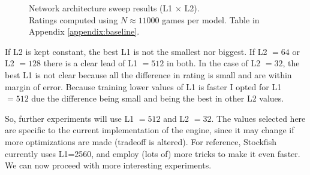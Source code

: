 \begin{figure}[h]
\centering
{}
\captionsetup{justification=centering}
\caption{Network architecture sweep results (L1 $\times$ L2).\\ Ratings computed using $N\approx11000$ games per model. Table in Appendix \ref{appendix:baseline}.}
\label{fig:baseline_heatmaps}
\end{figure}

If L2 is kept constant, the best L1 is not the smallest nor biggest. If L2 $=64$ or L2 $=128$ there is a clear lead of L1 $=512$ in both. In the case of L2 $=32$, the best L1 is not clear because all the difference in rating is small and are within margin of error. Because training lower values of L1 is faster I opted for L1 $=512$ due the difference being small and being the best in other L2 values.

So, further experiments will use L1 $=512$ and L2 $=32$. The values selected here are specific to the current implementation of the engine, since it may change if more optimizations are made (tradeoff is altered). For reference, Stockfish currently uses L1=2560, and employ (lots of) more tricks to make it even faster. We can now proceed with more interesting experiments.
